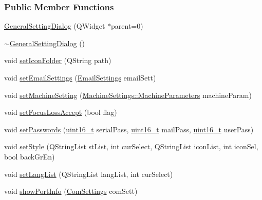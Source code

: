 \subsubsection*{Public Member Functions}
\begin{DoxyCompactItemize}
\item 
\mbox{\hyperlink{classGeneralSettingDialog_a04717ff5a0b42fb1ebeb5dcfc934cd83}{General\+Setting\+Dialog}} (Q\+Widget $\ast$parent=0)
\item 
\mbox{\hyperlink{classGeneralSettingDialog_a6e45c39d066344fdc3fd8556bed18cd3}{$\sim$\+General\+Setting\+Dialog}} ()
\item 
void \mbox{\hyperlink{classGeneralSettingDialog_ab9ca0f722e745c5cbf9d35c0307a2740}{set\+Icon\+Folder}} (Q\+String path)
\item 
void \mbox{\hyperlink{classGeneralSettingDialog_a418a131dbac78536218003bafc7988ae}{set\+Email\+Settings}} (\mbox{\hyperlink{structEmailSettings}{Email\+Settings}} email\+Sett)
\item 
void \mbox{\hyperlink{classGeneralSettingDialog_a62392d2454fdaf652f789792b50f9c6c}{set\+Machine\+Setting}} (\mbox{\hyperlink{classMachineSettings_a87879e13793dbc7c10d4fa18e1236751}{Machine\+Settings\+::\+Machine\+Parameters}} machine\+Param)
\item 
void \mbox{\hyperlink{classGeneralSettingDialog_a43d51bbc0d1681b933c9c630c08e88fa}{set\+Focus\+Loss\+Accept}} (bool flag)
\item 
void \mbox{\hyperlink{classGeneralSettingDialog_a73e0c08d830948be4ec0f8d3d155c5ca}{set\+Passwords}} (\mbox{\hyperlink{settings_8h_a017dd44e68049ffdd31500a8cd01ba68}{uint16\+\_\+t}} serial\+Pass, \mbox{\hyperlink{settings_8h_a017dd44e68049ffdd31500a8cd01ba68}{uint16\+\_\+t}} mail\+Pass, \mbox{\hyperlink{settings_8h_a017dd44e68049ffdd31500a8cd01ba68}{uint16\+\_\+t}} user\+Pass)
\item 
void \mbox{\hyperlink{classGeneralSettingDialog_a1746ad8d326d2adff1e8297f48119835}{set\+Style}} (Q\+String\+List st\+List, int cur\+Select, Q\+String\+List icon\+List, int icon\+Sel, bool back\+Gr\+En)
\item 
void \mbox{\hyperlink{classGeneralSettingDialog_a6ba230057e081886f781539e4464ba99}{set\+Lang\+List}} (Q\+String\+List lang\+List, int cur\+Select)
\item 
void \mbox{\hyperlink{classGeneralSettingDialog_a947b14b03ff390dc93d9d3d5cc8ef962}{show\+Port\+Info}} (\mbox{\hyperlink{structComSettings}{Com\+Settings}} com\+Sett)
\end{DoxyCompactItemize}
